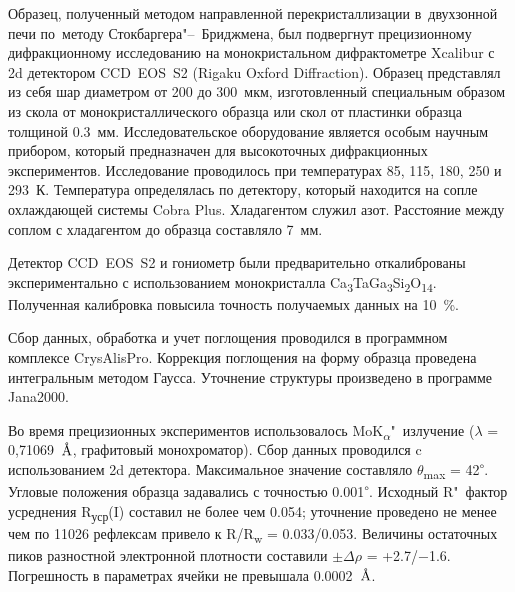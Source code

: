 Образец, полученный методом направленной перекристаллизации в~двухзонной печи по~методу Стокбаргера"--~Бриджмена, был подвергнут прецизионному дифракционному исследованию на монокристальном дифрактометре Xcalibur с 2d детектором CCD~EOS~S2 (Rigaku Oxford Diffraction). Образец представлял из себя шар диаметром от 200 до 300~мкм, изготовленный специальным образом из скола от монокристаллического образца или скол от пластинки образца толщиной 0.3~мм. Исследовательское оборудование является особым научным прибором, который предназначен для высокоточных дифракционных экспериментов. Исследование проводилось при температурах 85, 115, 180, 250 и 293~К\cite{Dudka2016}. Температура определялась по детектору, который находится на сопле охлаждающей системы Cobra Plus. Хладагентом служил азот. Расстояние между соплом с хладагентом до образца составляло 7~мм.

Детектор CCD~EOS~S2 и гониометр были предварительно откалиброваны экспериментально\cite{Dudka2010} с использованием монокристалла Ca\textsubscript{3}TaGa\textsubscript{3}Si\textsubscript{2}O\textsubscript{14}\cite{Dudka2016_b}. Полученная калибровка повысила точность получаемых данных на 10~\%.

Сбор данных, обработка и учет поглощения проводился в программном комплексе  CrysAlisPro. Коррекция поглощения на форму образца проведена интегральным методом Гаусса. Уточнение структуры произведено в программе Jana2000\cite{Dusek2001}.






Во время прецизионных  экспериментов использовалось MoK\textsubscript{$\alpha$}"~излучение ($\lambda$ = 0,71069~${\mbox{\normalfont\AA}}$, графитовый монохроматор). Сбор данных проводился c использованием 2d детектора. Максимальное значение составляло $\theta$\textsubscript{max} = 42\textsuperscript{$\circ$}.
Угловые положения образца задавались с точностью 0.001\textsuperscript{$\circ$}.
Исходный R"~фактор усреднения R\textsubscript{уср}(I) составил не более чем  0.054; уточнение проведено не менее чем по 11026 рефлексам привело к R/R\textsubscript{w} = 0.033/0.053.
Величины остаточных пиков разностной электронной плотности составили $\pm\Delta$$\rho$ = +2.7/$-$1.6.
Погрешность в параметрах ячейки не превышала 0.0002~{$\mbox{\normalfont\AA}$}.


